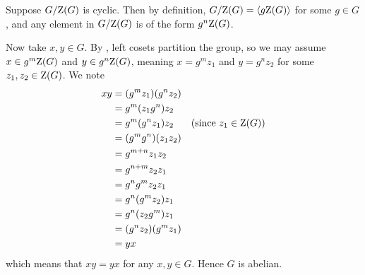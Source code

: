 \begin{questions}
    \item Suppose $G / \mathrm{Z}(G)$ is cyclic. Then by definition, $G / \mathrm{Z}(G) = \langle g\mathrm{Z}(G)\rangle$ for some $g \in G$, and any element in $G/\mathrm{Z}(G)$ is of the form $g^n\mathrm{Z}(G)$.

    Now take $x, y \in G$. By , left cosets partition the group, so we may assume $x \in g^m\mathrm{Z}(G)$ and $y \in g^n\mathrm{Z}(G)$, meaning $x = g^mz_1$ and $y = g^nz_2$ for some $z_1, z_2 \in \mathrm{Z}(G)$. We note
    \begin{align*}
        xy &= (g^mz_1)(g^nz_2)\\
        &= g^m(z_1g^n)z_2\\
        &= g^m(g^nz_1)z_2 & (\text{since }z_1 \in \mathrm{Z}(G))\\
        &= (g^mg^n)(z_1z_2)\\
        &= g^{m+n}z_1z_2\\
        &= g^{n+m}z_2z_1\\
        &= g^ng^mz_2z_1\\
        &= g^n(g^mz_2)z_1\\
        &= g^n(z_2g^m)z_1\\
        &= (g^nz_2)(g^mz_1)\\
        &= yx
    \end{align*}
    which means that $xy = yx$ for any $x, y \in G$. Hence $G$ is abelian.
\end{questions}
